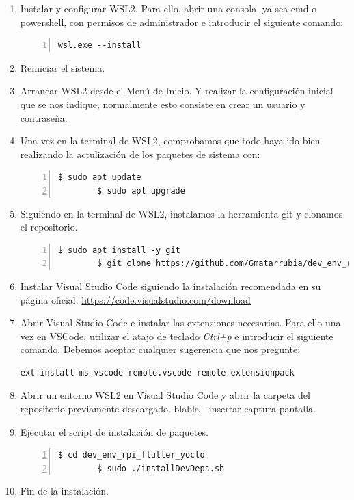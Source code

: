 \begin{enumerate}
    \item Instalar y configurar \gls{WSL2}. Para ello, abrir una consola, ya sea cmd
    o powershell, con permisos de administrador e introducir el siguiente comando:
    \begin{lstlisting}[style=cmd, numbers=left]
        wsl.exe --install
    \end{lstlisting}

    \item Reiniciar el sistema.

    \item Arrancar \gls{WSL2} desde el Menú de Inicio. Y realizar la configuración
    inicial que se nos indique, normalmente esto consiste en crear un usuario y
    contraseña.

    \item Una vez en la terminal de \gls{WSL2}, comprobamos que todo haya ido bien realizando
    la actulización de los paquetes de sistema con:
    \begin{lstlisting}[style=consola, numbers=left]
        $ sudo apt update
        $ sudo apt upgrade
    \end{lstlisting}

    \item Siguiendo en la terminal de \gls{WSL2}, instalamos la herramienta git y clonamos
    el repositorio.
    \begin{lstlisting}[style=consola, numbers=left]
        $ sudo apt install -y git
        $ git clone https://github.com/Gmatarrubia/dev_env_rpi_flutter_yocto.git
    \end{lstlisting}

    \item Instalar Visual Studio Code siguiendo la instalación recomendada en su página
    oficial: \href{https://code.visualstudio.com/download}{https://code.visualstudio.com/download}

    \item Abrir Visual Studio Code e instalar las extensiones necesarias. Para ello
    una vez en VSCode, utilizar el atajo de teclado \emph{Ctrl+p} e introducir el siguiente
    comando. Debemos aceptar cualquier sugerencia que nos pregunte:
    \begin{lstlisting}[style=cmd]
        ext install ms-vscode-remote.vscode-remote-extensionpack
    \end{lstlisting}

    \item Abrir un entorno \gls{WSL2} en Visual Studio Code y abrir la carpeta del repositorio
    previamente descargado.
    blabla - insertar captura pantalla.

    \item Ejecutar el script de instalación de paquetes.
    \begin{lstlisting}[style=consola, numbers=left]
        $ cd dev_env_rpi_flutter_yocto
        $ sudo ./installDevDeps.sh
    \end{lstlisting}

    \item Fin de la instalación.
\end{enumerate}

